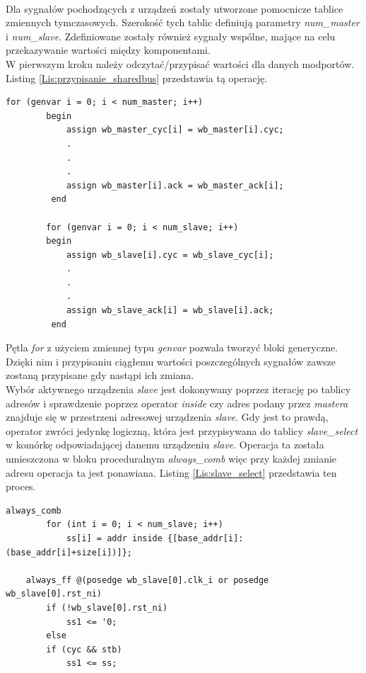 \documentclass[11pt,a4paper]{article}
\begin{document}
\\
		Dla sygnałów pochodzących z urządzeń zostały utworzone pomocnicze tablice zmiennych tymczasowych. Szerokość tych tablic definiują parametry \textit{num\_master} i \textit{num\_slave}. Zdefiniowane zostały również sygnały wspólne, mające na celu przekazywanie wartości między komponentami.\\
		W pierwszym kroku należy odczytać/przypisać wartości dla danych modportów. Listing \ref{Lis:przypisanie_sharedbus} przedstawia tą operację.\\
				\begin{minipage}{\textwidth}
\begin{scriptsize}
\begin{lstlisting}[label=Lis:przypisanie_sharedbus,caption=Przykładowa inicjalizacja modułu \textit{wishbone\_sharedbus}]
    for (genvar i = 0; i < num_master; i++)
        begin
            assign wb_master_cyc[i] = wb_master[i].cyc;
            .
            .
            .
            assign wb_master[i].ack = wb_master_ack[i];            
         end

        for (genvar i = 0; i < num_slave; i++)
        begin
            assign wb_slave[i].cyc = wb_slave_cyc[i];
            .
            .
            .            
            assign wb_slave_ack[i] = wb_slave[i].ack;            
         end
\end{lstlisting}
\end{scriptsize}
\end{minipage}
Pętla \textit{for} z użyciem zmiennej typu \textit{genvar} pozwala tworzyć bloki generyczne. Dzięki nim i przypisaniu ciągłemu wartości poszczególnych sygnałów zawsze zostaną przypisane gdy nastąpi ich zmiana.\\
Wybór aktywnego urządzenia \textit{slave} jest dokonywany poprzez iterację po tablicy adresów i sprawdzenie poprzez operator \textit{inside} czy adres podany przez \textit{mastera} znajduje się w przestrzeni adresowej urządzenia \textit{slave}. Gdy jest to prawdą, operator zwróci jedynkę logiczną, która jest przypisywana do tablicy \textit{slave\_select} w komórkę odpowiadającej danemu urządzeniu \textit{slave}. Operacja ta została umieszczona w bloku proceduralnym \textit{always\_comb} więc przy każdej zmianie adresu operacja ta jest ponawiana. Listing \ref{Lis:slave_select} przedstawia ten proces.\\
\begin{minipage}{\textwidth}
\begin{scriptsize}
\begin{lstlisting}[label=Lis:slave_select,caption=Wybór urządzenia \textit{slave}]
	always_comb
		for (int i = 0; i < num_slave; i++)
			ss[i] = addr inside {[base_addr[i]:(base_addr[i]+size[i])]};
            
	always_ff @(posedge wb_slave[0].clk_i or posedge wb_slave[0].rst_ni)
		if (!wb_slave[0].rst_ni)
			ss1 <= '0;
		else
		if (cyc && stb)
			ss1 <= ss;
\end{lstlisting}
\end{scriptsize}
\end{minipage}
\end{document}
